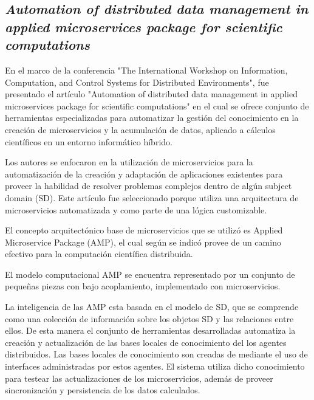 \subsection{
    \textbf{\emph{Automation of distributed data management in applied
            microservices package for scientific computations
        }
    }
}

En el marco de la conferencia
"The International Workshop on Information, Computation, and Control Systems for Distributed Environments",
fue presentado el artículo "Automation of distributed data management in applied
microservices package for scientific computations"\cite{oparin_automation_2020} en el cual se ofrece conjunto de herramientas especializadas para automatizar la gestión del conocimiento en
la creación de microservicios y la acumulación de datos, aplicado a
cálculos científicos en un entorno informático híbrido.\par

Los autores se enfocaron en la utilización de microservicios para la automatización de la creación y adaptación de aplicaciones existentes para proveer la habilidad de resolver problemas complejos dentro de algún subject domain (SD).
Este artículo fue seleccionado porque utiliza una arquitectura de microservicios automatizada y como parte de una
lógica customizable.\par

El concepto arquitectónico base de microservicios que se utilizó es Applied Microservice Package (AMP),
el cual según se indicó provee de un camino efectivo para la computación científica distribuida.\par

El modelo computacional AMP se encuentra representado por un conjunto de pequeñas piezas con bajo acoplamiento,
implementado con microservicios.\par

La inteligencia de las AMP esta basada en el modelo de SD,
que se comprende como una colección de información sobre los objetos SD y las relaciones entre ellos.
De esta manera el conjunto de herramientas desarrolladas automatiza la creación y actualización
de las bases locales de conocimiento del los agentes distribuidos. Las bases locales de conocimiento
son creadas de mediante el uso de interfaces administradas por estos agentes.
El sistema utiliza dicho conocimiento para testear las actualizaciones de los microservicios,
además de proveer sincronización y persistencia de los datos calculados.\par

